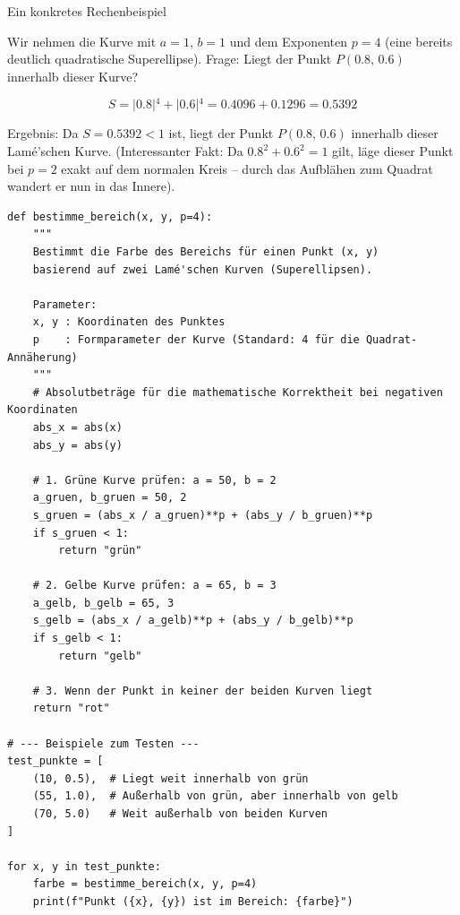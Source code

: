 Ein konkretes Rechenbeispiel

Wir nehmen die Kurve mit \(a = 1\), \(b = 1\) und dem Exponenten \(p = 4\) (eine bereits deutlich quadratische Superellipse).
Frage: Liegt der Punkt \(P(0.8, \, 0.6)\) innerhalb dieser Kurve?

\begin{equation}
    S 
    = 
    \left|{}0.8\right|{}^{4}+\left|{}0.6\right|{}^{4}
    =
    0.4096+0.1296
    =
    0.5392
\end{equation}

Ergebnis: Da \(S = 0.5392 < 1\) ist, liegt der Punkt \(P(0.8, \, 0.6)\) innerhalb dieser Lamé'schen Kurve. (Interessanter Fakt: Da \(0.8^2 + 0.6^2 = 1\) gilt, läge dieser Punkt bei \(p=2\) exakt auf dem normalen Kreis – durch das Aufblähen zum Quadrat wandert er nun in das Innere).



\begin{verbatim}  
def bestimme_bereich(x, y, p=4):
    """
    Bestimmt die Farbe des Bereichs für einen Punkt (x, y) 
    basierend auf zwei Lamé'schen Kurven (Superellipsen).
    
    Parameter:
    x, y : Koordinaten des Punktes
    p    : Formparameter der Kurve (Standard: 4 für die Quadrat-Annäherung)
    """
    # Absolutbeträge für die mathematische Korrektheit bei negativen Koordinaten
    abs_x = abs(x)
    abs_y = abs(y)
    
    # 1. Grüne Kurve prüfen: a = 50, b = 2
    a_gruen, b_gruen = 50, 2
    s_gruen = (abs_x / a_gruen)**p + (abs_y / b_gruen)**p
    if s_gruen < 1:
        return "grün"
        
    # 2. Gelbe Kurve prüfen: a = 65, b = 3
    a_gelb, b_gelb = 65, 3
    s_gelb = (abs_x / a_gelb)**p + (abs_y / b_gelb)**p
    if s_gelb < 1:
        return "gelb"
        
    # 3. Wenn der Punkt in keiner der beiden Kurven liegt
    return "rot"

# --- Beispiele zum Testen ---
test_punkte = [
    (10, 0.5),  # Liegt weit innerhalb von grün
    (55, 1.0),  # Außerhalb von grün, aber innerhalb von gelb
    (70, 5.0)   # Weit außerhalb von beiden Kurven
]

for x, y in test_punkte:
    farbe = bestimme_bereich(x, y, p=4)
    print(f"Punkt ({x}, {y}) ist im Bereich: {farbe}")
  
\end{verbatim}
